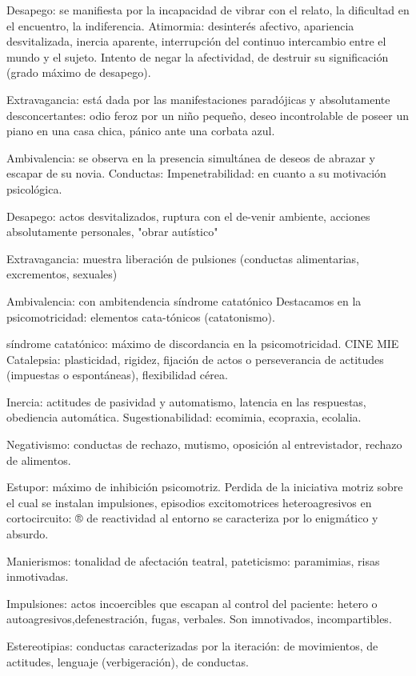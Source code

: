 Desapego: se manifiesta por la incapacidad de vibrar con el relato, la dificultad en el encuentro, la indiferencia. Atimormia: desinterés afectivo, apariencia desvitalizada, inercia aparente, interrupción del continuo intercambio entre el mundo y el sujeto. Intento de negar la afectividad, de destruir su significación (grado máximo de desapego).

Extravagancia: está dada por las manifestaciones paradójicas y absolutamente desconcertantes: odio feroz por un niño pequeño, deseo incontrolable de poseer un piano en una casa chica, pánico ante una corbata azul.

Ambivalencia: se observa en la presencia simultánea de deseos de abrazar y escapar de su novia. Conductas: Impenetrabilidad: en cuanto a su motivación psicológica.

Desapego: actos desvitalizados, ruptura con el de-venir ambiente, acciones absolutamente personales, "obrar autístico"

Extravagancia: muestra liberación de pulsiones (conductas alimentarias, excrementos, sexuales)

Ambivalencia: con ambitendencia síndrome catatónico Destacamos en la psicomotricidad: elementos cata-tónicos (catatonismo).

síndrome catatónico: máximo de discordancia en la psicomotricidad. CINE MIE Catalepsia: plasticidad, rigidez, fijación de actos o perseverancia de actitudes (impuestas o espontáneas), flexibilidad cérea.

Inercia: actitudes de pasividad y automatismo, latencia en las respuestas, obediencia automática. Sugestionabilidad: ecomimia, ecopraxia, ecolalia.

Negativismo: conductas de rechazo, mutismo, oposición al entrevistador, rechazo de alimentos.

Estupor: máximo de inhibición psicomotriz. Perdida de la iniciativa motriz sobre el cual se instalan impulsiones, episodios excitomotrices heteroagresivos en cortocircuito: ® de reactividad al entorno se caracteriza por lo enigmático y absurdo.

Manierismos: tonalidad de afectación teatral, pateticismo: paramimias, risas inmotivadas.

Impulsiones: actos incoercibles que escapan al control del paciente: hetero o autoagresivos,defenestración, fugas, verbales. Son imnotivados, incompartibles.

Estereotipias: conductas caracterizadas por la iteración: de movimientos, de actitudes, lenguaje (verbigeración), de conductas.
